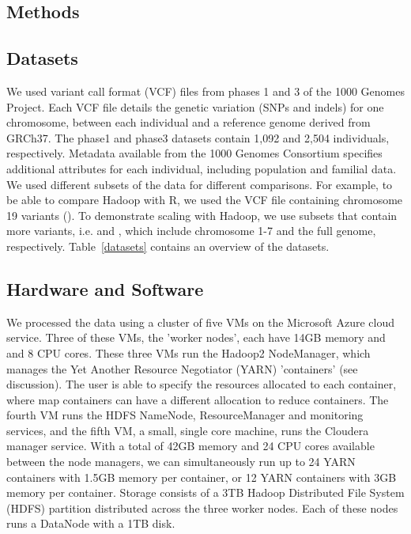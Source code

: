 \documentclass{bioinfo}
\begin{document}


\begin{methods}
\section{Methods}
\subsection*{Datasets}
We used variant call format (VCF) files from phases 1 and 3 of the 1000 Genomes Project.
Each VCF file details the genetic variation (SNPs and indels) for one chromosome, between each individual and a reference genome derived from GRCh37. 
The phase1 and phase3 datasets contain 1,092 and 2,504 individuals, respectively.
Metadata available from the 1000 Genomes Consortium specifies additional attributes for each individual, including population and familial data.\\
We used different subsets of the data for different comparisons. For example, to be able to compare Hadoop with R, we used the VCF file containing chromosome 19 variants (\NinteenPhaseone{}).
To demonstrate scaling with Hadoop, we use subsets that contain more variants, i.e. \SevenPhaseone{} and \FullPhaseone{}, which include chromosome 1-7 and the full genome, respectively.
Table~\ref{datasets} contains an overview of the datasets.

\subsection*{Hardware and Software}
We processed the data using a cluster of five VMs on the Microsoft Azure cloud service. Three of these VMs, the 'worker nodes', each have 14GB memory and and 8 CPU cores. These three VMs run the Hadoop2 NodeManager, which manages the Yet Another Resource Negotiator (YARN) 'containers' (see discussion).
The user is able to specify the resources allocated to each container, where map containers can have a different allocation to reduce containers.
The fourth VM runs the HDFS NameNode, ResourceManager and monitoring services, and the fifth VM, a small, single core machine, runs the Cloudera manager service.
With a total of 42GB memory and 24 CPU cores available between the node managers, we can simultaneously run up to 24 YARN containers with 1.5GB memory per container, or 12 YARN containers with 3GB memory per container.
Storage consists of a 3TB Hadoop Distributed File System (HDFS) partition distributed across the three worker nodes. Each of these nodes runs a DataNode with a 1TB disk.


\end{methods}
\end{document}
